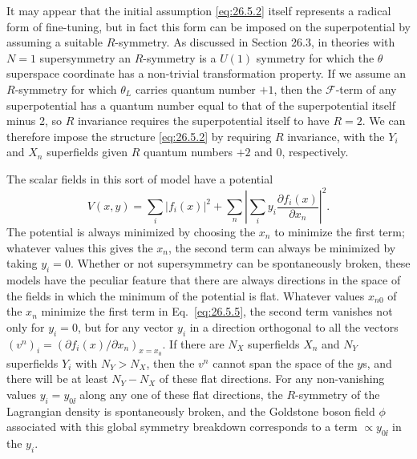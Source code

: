 It may appear that the initial assumption \eqref{eq:26.5.2} itself represents
a radical form of fine-tuning, but in fact this form can be imposed on the
superpotential by assuming a suitable $R$-symmetry. As discussed in Section
26.3, in theories with $N=1$ supersymmetry an $R$-symmetry is a $U(1)$
symmetry for which the $\theta$ superspace coordinate has a non-trivial
transformation property. If we assume an $R$-symmetry for which $\theta_L$
carries quantum number $+1$, then the $\mathcal{F}$-term of any
superpotential has a
quantum number equal to that of the superpotential itself minus 2, so $R$
invariance requires the superpotential itself to have $R=2$. We can
therefore impose the structure \eqref{eq:26.5.2} by requiring $R$ invariance,
with the $Y_i$ and $X_n$ superfields given $R$ quantum numbers $+2$ and 0,
respectively.

The scalar fields in this sort of model have a potential
\begin{equation}
  V(x,y)
  =\sum_i\lvert f_i(x)\rvert^2
   +\sum_n\left\lvert
     \sum_i y_i\frac{\partial f_i(x)}{\partial x_n}
   \right\rvert^2 .
  \tag{26.5.5}\label{eq:26.5.5}
\end{equation}
The potential is always minimized by choosing the $x_n$ to minimize the first
term; whatever values this gives the $x_n$, the second term can always be
minimized by taking $y_i=0$. Whether or not supersymmetry can be
spontaneously broken, these models have the peculiar feature that there are
always directions in the space of the fields in which the minimum of the
potential is flat. Whatever values $x_{n0}$ of the $x_n$ minimize the first
term in Eq.~\eqref{eq:26.5.5}, the second term vanishes not only for $y_i=0$,
but for any vector $y_i$ in a direction orthogonal to all the vectors
$(v^n)_i=(\partial f_i(x)/\partial x_n)_{x=x_0}$. If there are $N_X$
superfields $X_n$ and $N_Y$ superfields $Y_i$ with $N_Y>N_X$, then the $v^n$
cannot span the space of the $y$s, and there will be at least $N_Y-N_X$ of
these flat directions. For any non-vanishing values $y_i=y_{0\ii}$ along any
one of these flat directions, the $R$-symmetry of the Lagrangian density is
spontaneously broken, and the Goldstone boson field $\phi$ associated with
this global symmetry breakdown corresponds to a term $\propto y_{0\ii}$ in the
$y_i$.

